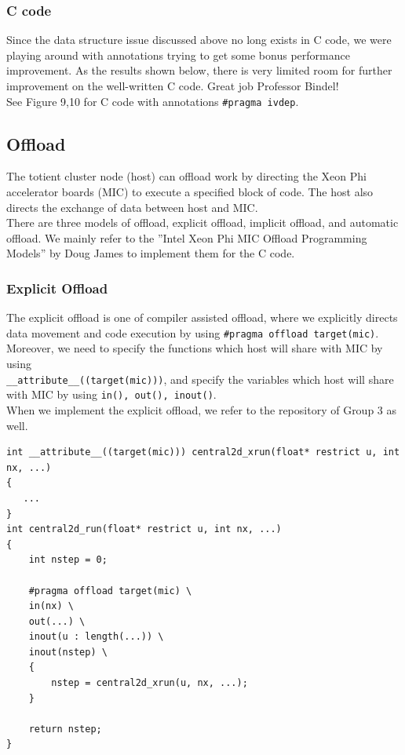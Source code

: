 \documentclass[12pt]{article}
\numberwithin{equation}{section}
\begin{document}
\subsubsection{C code}
Since the data structure issue discussed above no long exists in C code, we were
playing around with annotations trying to get some bonus performance improvement.
As the results shown below, there is very limited room for further improvement
on the well-written C code. Great job Professor Bindel!
\\
See Figure 9,10 for C code with annotations \texttt{\#pragma ivdep}.

\subsection{Offload}

The totient cluster node (host) can offload work by directing the Xeon Phi accelerator boards (MIC) to execute a specified block of code. The host also directs the exchange of data between host and MIC.
\\
There are three models of offload, explicit offload, implicit offload, and automatic offload. We mainly refer to the ''Intel Xeon Phi MIC Offload Programming Models'' by Doug James to implement them for the C code.

\subsubsection{Explicit Offload}

The explicit offload is one of compiler assisted offload, where we explicitly directs data movement and code execution by using \texttt{\#pragma offload target(mic)}.
\\
Moreover, we need to specify the functions which host will share with MIC by using \\ \texttt{\_\_attribute\_\_((target(mic)))}, and specify the variables which host will share with MIC by using \texttt{in(), out(), inout()}.
\\
When we implement the explicit offload, we refer to the repository of Group 3 as well.

\scriptsize
\begin{lstlisting}
int __attribute__((target(mic))) central2d_xrun(float* restrict u, int nx, ...)
{
   ...
}
int central2d_run(float* restrict u, int nx, ...)
{
    int nstep = 0;

    #pragma offload target(mic) \
    in(nx) \
    out(...) \
    inout(u : length(...)) \
    inout(nstep) \
    {
        nstep = central2d_xrun(u, nx, ...);
    }

    return nstep;
}
\end{lstlisting}
\end{document}
